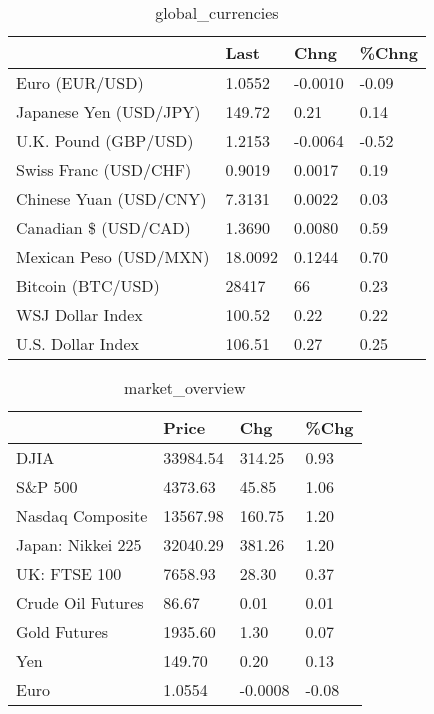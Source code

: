 \documentclass{article}%
\begin{document}
%


\begin{table}[htbp]%
\caption{global\_currencies}%
\centering%
\begin{adjustbox}{width=1\textwidth}%
\begin{tabular}{llll}
\toprule
                       &    Last &    Chng & \%Chng \\
\midrule
        Euro (EUR/USD) &  1.0552 & -0.0010 & -0.09 \\
Japanese Yen (USD/JPY) &  149.72 &    0.21 &  0.14 \\
  U.K. Pound (GBP/USD) &  1.2153 & -0.0064 & -0.52 \\
 Swiss Franc (USD/CHF) &  0.9019 &  0.0017 &  0.19 \\
Chinese Yuan (USD/CNY) &  7.3131 &  0.0022 &  0.03 \\
  Canadian \$ (USD/CAD) &  1.3690 &  0.0080 &  0.59 \\
Mexican Peso (USD/MXN) & 18.0092 &  0.1244 &  0.70 \\
     Bitcoin (BTC/USD) &   28417 &      66 &  0.23 \\
      WSJ Dollar Index &  100.52 &    0.22 &  0.22 \\
     U.S. Dollar Index &  106.51 &    0.27 &  0.25 \\
\bottomrule
\end{tabular}
%
\end{adjustbox}%
\end{table}

%


\begin{table}[htbp]%
\caption{market\_overview}%
\centering%
\begin{adjustbox}{width=1\textwidth}%
\begin{tabular}{llll}
\toprule
                  &    Price &     Chg &  \%Chg \\
\midrule
             DJIA & 33984.54 &  314.25 &  0.93 \\
          S\&P 500 &  4373.63 &   45.85 &  1.06 \\
 Nasdaq Composite & 13567.98 &  160.75 &  1.20 \\
Japan: Nikkei 225 & 32040.29 &  381.26 &  1.20 \\
     UK: FTSE 100 &  7658.93 &   28.30 &  0.37 \\
Crude Oil Futures &    86.67 &    0.01 &  0.01 \\
     Gold Futures &  1935.60 &    1.30 &  0.07 \\
              Yen &   149.70 &    0.20 &  0.13 \\
             Euro &   1.0554 & -0.0008 & -0.08 \\
\bottomrule
\end{tabular}
%
\end{adjustbox}%
\end{table}

%
\end{document}
